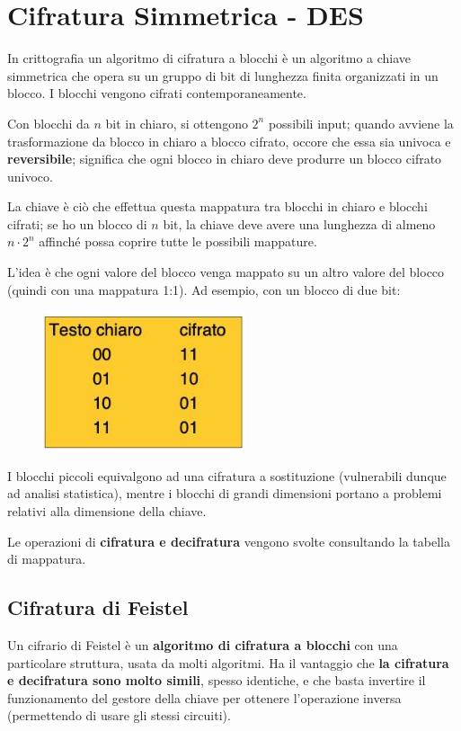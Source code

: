 \chapter{Cifratura Simmetrica - DES}
In crittografia un algoritmo di cifratura a blocchi è un algoritmo a chiave simmetrica che opera su un gruppo di bit di lunghezza 
finita organizzati in un blocco. I blocchi vengono cifrati contemporaneamente.

\noindent Con blocchi da $n$ bit in chiaro, si ottengono $2^n$ possibili input; quando avviene la trasformazione da blocco in chiaro a blocco cifrato,
occore che essa sia univoca e \textbf{reversibile}; significa che ogni blocco in chiaro deve produrre un blocco cifrato univoco.

\noindent La chiave è ciò che effettua questa mappatura tra blocchi in chiaro e blocchi cifrati; se ho un blocco di $n$ bit, la chiave deve 
avere una lunghezza di almeno $n \cdot 2^n$ affinché possa coprire tutte le possibili mappature. 

\noindent L'idea è che ogni valore del blocco 
venga mappato su un altro valore del blocco (quindi con una mappatura 1:1). Ad esempio, con un blocco di due bit:

\begin{figure}[H]
    \centering
    \includegraphics[width=0.3\linewidth]{chapters/chap4/images/mappatura.png}
\end{figure}

\noindent I blocchi piccoli equivalgono ad una cifratura a sostituzione (vulnerabili dunque ad analisi statistica), mentre i blocchi di grandi 
dimensioni portano a problemi relativi alla dimensione della chiave.

\noindent Le operazioni di \textbf{cifratura e decifratura} vengono svolte consultando la tabella di mappatura.

\section{Cifratura di Feistel}

Un cifrario di Feistel è un \textbf{algoritmo di cifratura a blocchi} con una particolare struttura, usata da molti algoritmi. Ha il vantaggio 
che \textbf{la cifratura e decifratura sono molto simili}, spesso identiche, e che basta invertire il funzionamento del gestore della chiave 
per ottenere l'operazione inversa (permettendo di usare gli stessi circuiti).

